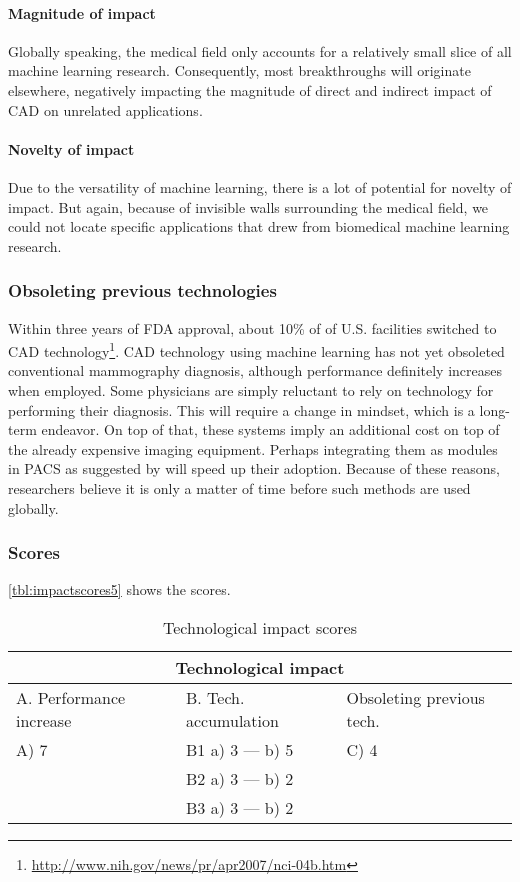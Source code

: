 \paragraph{Magnitude of impact}
Globally speaking, the medical field only accounts for a relatively small slice
of all machine learning research. Consequently, most breakthroughs will
originate elsewhere, negatively impacting the magnitude of direct and
indirect impact of CAD on unrelated applications.

\paragraph{Novelty of impact}
Due to the versatility of machine learning, there is a lot of potential
for novelty of impact. But again, because of invisible walls surrounding the
medical field, we could not locate specific applications that drew from
biomedical machine learning research.

\subsubsection{Obsoleting previous technologies}
Within three years of FDA approval, about 10\% of of U.S. facilities switched to
CAD technology\footnote{\url{http://www.nih.gov/news/pr/apr2007/nci-04b.htm}}.
CAD technology using machine learning has not yet obsoleted conventional
mammography diagnosis, although performance definitely increases when employed.
Some physicians are simply reluctant to rely on technology for performing their
diagnosis. This will require a change in mindset, which is a long-term endeavor.
On top of that, these systems imply an additional cost on top of the already
expensive imaging equipment. Perhaps integrating them as modules in PACS as
suggested by \cite{cadhistory} will speed up their adoption. Because of these
reasons, researchers believe it is only a matter of time before such methods are
used globally.

\subsubsection{Scores}
\autoref{tbl:impactscores5} shows the scores.

\begin{table}[h]
\centering
\begin{tabular}{l l l}
\hline
\multicolumn{3}{|c|}{Technological impact} \\
\hline
A. Performance increase & B. Tech. accumulation & Obsoleting previous tech.\\
A) 7 & B1 a) 3 --- b) 5 & C) 4\\ 
     & B2 a) 3 --- b) 2 & \\
     & B3 a) 3 --- b) 2 & \\
\hline
\end{tabular}
\caption{Technological impact scores}
\label{tbl:impactscores5}
\end{table}